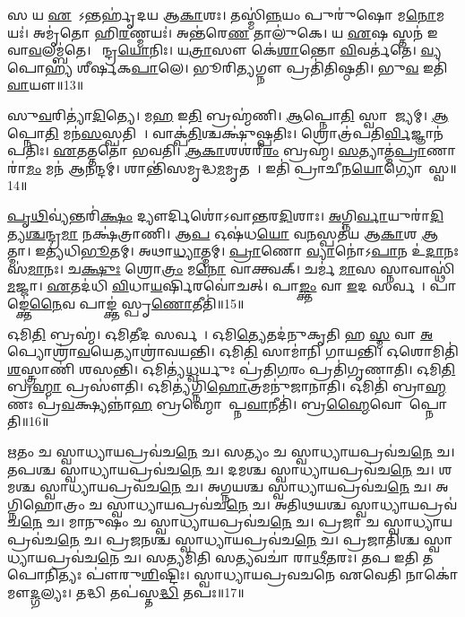 𑌸 𑌯 \ul{𑌏}𑌷𑍋᳚𑌽𑌨𑍍𑌤𑌰𑍍\mbox{}𑌹𑍃॑𑌦𑌯 𑌆\ul{𑌕𑌾}𑌶𑌃। 
𑌤𑌸𑍍𑌮𑌿॑\ul{𑌨𑍍𑌨}𑌯𑌂 𑌪𑍁𑌰𑍁॑𑌷𑍋 𑌮\ul{𑌨𑍋}𑌮𑌯𑌃॑। 
𑌅𑌮𑍃॑𑌤𑍋 𑌹𑌿\ul{𑌰}𑌣𑍍𑌮𑌯𑌃॑। 
𑌅𑌨𑍍𑌤॑𑌰𑍇\ul{𑌣} 𑌤𑌾𑌲𑍁॑𑌕𑍇। 
𑌯 \ul{𑌏}𑌷 𑌸𑍍𑌤𑌨॑ 𑌇𑌵𑌾\ul{𑌵}\-𑌲𑌮𑍍𑌬॑𑌤𑍇। 
𑌸𑍇᳚𑌨𑍍𑌦𑍍𑌰\ul{𑌯𑍋}𑌨𑌿𑌃। 
𑌯\ul{𑌤𑍍𑌰𑌾}𑌸𑍗 𑌕𑍇॑\ul{𑌶𑌾}𑌨𑍍𑌤𑍋 \ul{𑌵𑌿}𑌵𑌰𑍍𑌤॑𑌤𑍇। 
\ul{𑌵𑍍𑌯}𑌪𑍋𑌹𑍍𑌯॑ 𑌶𑍀𑌰𑍍\mbox{}𑌷𑌕\ul{𑌪𑌾}𑌲𑍇। 
𑌭𑍂𑌰𑌿\ul{𑌤𑍍𑌯}𑌗𑍍𑌨𑍗 𑌪𑍍𑌰𑌤𑌿॑𑌤𑌿𑌷𑍍𑌠𑌤𑌿। 
𑌭𑍁\ul{𑌵} 𑌇𑌤𑌿॑ \ul{𑌵𑌾}𑌯𑍗॥13॥

𑌸𑍁\ul{𑌵}𑌰𑌿𑌤𑍍𑌯𑌾॑\ul{𑌦𑌿}𑌤𑍍𑌯𑍇। 
𑌮\ul{𑌹} 𑌇\ul{𑌤𑌿} 𑌬𑍍𑌰𑌹𑍍𑌮॑𑌣𑌿। 
\ul{𑌆}𑌪𑍍𑌨𑍋\ul{𑌤𑌿} 𑌸𑍍𑌵𑌾𑌰𑌾᳚𑌜𑍍𑌯𑌮𑍍। 
\ul{𑌆}𑌪𑍍𑌨𑍋\ul{𑌤𑌿} 𑌮𑌨॑\ul{𑌸}𑌸𑍍𑌪𑌤𑌿𑌮𑍍᳚। 
𑌵𑌾𑌕𑍍𑌪॑\ul{𑌤𑌿}𑌶𑍍𑌚𑌕𑍍𑌷𑍁॑𑌷𑍍𑌪𑌤𑌿𑌃। 
𑌶𑍍𑌰𑍋𑌤𑍍𑌰॑𑌪𑌤𑌿\ul{𑌰𑍍𑌵𑌿}\-𑌜𑍍𑌞𑌾𑌨॑𑌪𑌤𑌿𑌃। 
\ul{𑌏}𑌤𑌤𑍍𑌤𑌤𑍋॑ 𑌭𑌵𑌤𑌿। 
\ul{𑌆}\ul{𑌕𑌾}𑌶𑌶॑𑌰𑍀\ul{𑌰𑌂} 𑌬𑍍𑌰𑌹𑍍𑌮॑। 
\ul{𑌸}𑌤𑍍𑌯𑌾𑌤𑍍𑌮॑\ul{𑌪𑍍𑌰𑌾}𑌣𑌾𑌰𑌾॑\ul{𑌮𑌂} 𑌮𑌨॑ 𑌆𑌨𑌨𑍍𑌦𑌮𑍍। 
𑌶𑌾𑌨𑍍𑌤𑌿॑𑌸𑌮𑍃𑌦𑍍𑌧\ul{𑌮}𑌮𑍃𑌤𑌮𑍍᳚। 
𑌇𑌤𑌿॑ 𑌪𑍍𑌰𑌾𑌚𑍀𑌨\ul{𑌯𑍋}𑌗𑍍𑌯𑍋𑌪𑌾᳚𑌸𑍍𑌵॥14॥
\anuvakamend[\ul{𑌵𑌾}𑌯𑌾\ul{𑌵}𑌮𑍃\ul{𑌤}𑌮𑍇𑌕𑌂॑ 𑌚]

\ul{𑌪𑍃}\ul{𑌥𑌿}𑌵𑍍𑌯॑𑌨𑍍𑌤𑌰𑌿॑\ul{𑌕𑍍𑌷𑌂} 𑌦𑍍𑌯𑍗𑌰𑍍𑌦𑌿𑌶𑍋॑𑌽𑌵𑌾𑌨𑍍𑌤𑌰\ul{𑌦𑌿}𑌶𑌾𑌃। 
\ul{𑌅}𑌗𑍍𑌨𑌿\ul{𑌰𑍍𑌵𑌾}𑌯𑍁𑌰𑌾॑\ul{𑌦𑌿}𑌤𑍍𑌯\-\ul{𑌶𑍍𑌚}𑌨𑍍𑌦𑍍𑌰\ul{𑌮𑌾} 𑌨𑌕𑍍𑌷॑𑌤𑍍𑌰𑌾𑌣𑌿। 
𑌆\ul{𑌪} 𑌓𑌷॑𑌧\ul{𑌯𑍋} 𑌵\ul{𑌨}𑌸𑍍𑌪𑌤॑𑌯 𑌆\ul{𑌕𑌾}𑌶 \ul{𑌆}𑌤𑍍𑌮𑌾। 
𑌇𑌤𑍍𑌯॑𑌧𑌿\ul{𑌭𑍂}𑌤𑌮𑍍। 
𑌅𑌥𑌾\ul{𑌧𑍍𑌯𑌾}𑌤𑍍𑌮𑌮𑍍। 
\ul{𑌪𑍍𑌰𑌾}𑌣𑍋 \ul{𑌵𑍍𑌯𑌾}𑌨𑍋॑𑌽\ul{𑌪𑌾}𑌨 𑌉॑\ul{𑌦𑌾}𑌨𑌃 𑌸॑\ul{𑌮𑌾}𑌨𑌃। 
𑌚\ul{𑌕𑍍𑌷𑍁𑌃} 𑌶𑍍𑌰𑍋\ul{𑌤𑍍𑌰𑌂} 𑌮\ul{𑌨𑍋} 𑌵𑌾𑌕𑍍𑌤𑍍𑌵𑌕𑍍। 
𑌚𑌰𑍍𑌮॑ \ul{𑌮𑌾}\ul{}𑌸 𑌸𑍍𑌨𑌾𑌵𑌾𑌸𑍍𑌥𑌿॑ \ul{𑌮}𑌜𑍍𑌜𑌾। 
\ul{𑌏}𑌤𑌦॑𑌧𑌿 \ul{𑌵𑌿}𑌧𑌾\ul{𑌯}𑌰𑍍\mbox{}\ul{𑌷𑌿}𑌰𑌵𑍋॑𑌚𑌤𑍍। 
𑌪𑌾\ul{𑌙𑍍𑌕𑍍𑌤𑌂} 𑌵𑌾 \ul{𑌇}𑌦 𑌸𑌰𑍍𑌵𑌮𑍍᳚। 
𑌪𑌾𑌙𑍍𑌕𑍍𑌤𑍇॑\ul{𑌨𑍈}𑌵 𑌪𑌾𑌙𑍍𑌕𑍍𑌤॑ 𑌸𑍍𑌪𑍃\ul{𑌣𑍋}𑌤𑍀𑌤𑌿॑॥15॥
\anuvakamend[𑌸\ul{𑌰𑍍𑌵}𑌮𑍇𑌕𑌂॑ 𑌚]

𑌓𑌮𑌿\ul{𑌤𑌿} 𑌬𑍍𑌰𑌹𑍍𑌮॑। 
𑌓𑌮𑌿\ul{𑌤𑍀}𑌦 𑌸𑌰𑍍𑌵𑌮𑍍᳚। 
𑌓𑌮𑌿\ul{𑌤𑍍𑌯𑍇}𑌤𑌦॑𑌨𑍁𑌕𑍃𑌤𑌿 𑌹 \ul{𑌸𑍍𑌮} 𑌵𑌾 \ul{𑌅}𑌪𑍍𑌯𑍋𑌶𑍍𑌰𑌾॑\ul{𑌵}𑌯𑍇𑌤𑍍𑌯𑌾𑌶𑍍𑌰𑌾॑𑌵𑌯𑌨𑍍𑌤𑌿। 
𑌓𑌮𑌿\ul{𑌤𑌿} 𑌸𑌾𑌮𑌾॑𑌨𑌿 𑌗𑌾𑌯𑌨𑍍𑌤𑌿। 
𑌓𑌶𑍋𑌮𑌿𑌤𑌿॑ \ul{𑌶}𑌸𑍍𑌤𑍍𑌰𑌾𑌣𑌿॑ 𑌶𑌸𑌨𑍍𑌤𑌿। 
𑌓𑌮𑌿𑌤𑍍𑌯॑\ul{𑌧𑍍𑌵}𑌰𑍍𑌯𑍁𑌃 𑌪𑍍𑌰॑𑌤𑌿\ul{𑌗}𑌰𑌂 𑌪𑍍𑌰𑌤𑌿॑𑌗𑍃𑌣𑌾𑌤𑌿। 
𑌓𑌮𑌿\ul{𑌤𑌿} 𑌬𑍍𑌰\ul{𑌹𑍍𑌮𑌾} 𑌪𑍍𑌰𑌸𑍗॑𑌤𑌿। 
𑌓𑌮𑌿𑌤𑍍𑌯॑𑌗𑍍𑌨𑌿\ul{𑌹𑍋}𑌤𑍍𑌰𑌮𑌨𑍁॑𑌜𑌾𑌨𑌾𑌤𑌿। 
𑌓𑌮𑌿𑌤𑌿॑ 𑌬𑍍𑌰𑌾\ul{𑌹𑍍𑌮}𑌣𑌃 𑌪𑍍𑌰॑\ul{𑌵}𑌕𑍍𑌷𑍍𑌯𑌨𑍍𑌨𑌾॑\ul{𑌹} 𑌬𑍍𑌰𑌹𑍍𑌮𑍋𑌪𑌾᳚𑌪𑍍𑌨\ul{𑌵𑌾}𑌨𑍀𑌤𑌿॑। 
𑌬𑍍𑌰\ul{𑌹𑍍𑌮𑍈}𑌵𑍋\-𑌪𑌾᳚𑌪𑍍𑌨𑍋𑌤𑌿॥16॥%
\anuvakamend[𑌓𑌨𑍍𑌦𑌶॑]

𑌋𑌤𑌂 𑌚 𑌸𑍍𑌵𑌾𑌧𑍍𑌯𑌾𑌯𑌪𑍍𑌰𑌵॑𑌚\ul{𑌨𑍇} 𑌚। 
𑌸𑌤𑍍𑌯𑌂 𑌚 𑌸𑍍𑌵𑌾𑌧𑍍𑌯𑌾𑌯𑌪𑍍𑌰𑌵॑𑌚\ul{𑌨𑍇} 𑌚। 
𑌤𑌪𑌶𑍍𑌚 𑌸𑍍𑌵𑌾𑌧𑍍𑌯𑌾𑌯𑌪𑍍𑌰𑌵॑𑌚\ul{𑌨𑍇} 𑌚। 
𑌦𑌮𑌶𑍍𑌚 𑌸𑍍𑌵𑌾𑌧𑍍𑌯𑌾𑌯𑌪𑍍𑌰𑌵॑𑌚\ul{𑌨𑍇} 𑌚। 
𑌶𑌮𑌶𑍍𑌚 𑌸𑍍𑌵𑌾𑌧𑍍𑌯𑌾𑌯𑌪𑍍𑌰𑌵॑𑌚\ul{𑌨𑍇} 𑌚। 
𑌅𑌗𑍍𑌨𑌯𑌶𑍍𑌚 𑌸𑍍𑌵𑌾𑌧𑍍𑌯𑌾𑌯𑌪𑍍𑌰𑌵॑𑌚\ul{𑌨𑍇} 𑌚। 
𑌅𑌗𑍍𑌨𑌿𑌹𑍋𑌤𑍍𑌰𑌂 𑌚 𑌸𑍍𑌵𑌾𑌧𑍍𑌯𑌾𑌯𑌪𑍍𑌰𑌵॑𑌚\ul{𑌨𑍇} 𑌚। 
𑌅𑌤𑌿𑌥𑌯𑌶𑍍𑌚 𑌸𑍍𑌵𑌾𑌧𑍍𑌯𑌾𑌯𑌪𑍍𑌰𑌵॑𑌚\ul{𑌨𑍇} 𑌚। 
𑌮𑌾𑌨𑍁𑌷𑌂 𑌚 𑌸𑍍𑌵𑌾𑌧𑍍𑌯𑌾𑌯𑌪𑍍𑌰𑌵॑𑌚\ul{𑌨𑍇} 𑌚। 
𑌪𑍍𑌰𑌜𑌾 𑌚 𑌸𑍍𑌵𑌾𑌧𑍍𑌯𑌾𑌯𑌪𑍍𑌰𑌵॑𑌚\ul{𑌨𑍇} 𑌚। 
𑌪𑍍𑌰𑌜𑌨𑌶𑍍𑌚 𑌸𑍍𑌵𑌾𑌧𑍍𑌯𑌾𑌯𑌪𑍍𑌰𑌵॑𑌚\ul{𑌨𑍇} 𑌚। 
𑌪𑍍𑌰𑌜𑌾𑌤𑌿𑌶𑍍𑌚 𑌸𑍍𑌵𑌾𑌧𑍍𑌯𑌾𑌯𑌪𑍍𑌰𑌵॑𑌚\ul{𑌨𑍇} 𑌚। 
𑌸𑌤𑍍𑌯𑌮𑌿𑌤𑌿 𑌸𑌤𑍍𑌯𑌵𑌚𑌾॑ 𑌰𑌾\ul{𑌥𑍀}𑌤𑌰𑌃। 
𑌤𑌪 𑌇𑌤𑌿 𑌤𑌪𑍋𑌨𑌿𑌤𑍍𑌯𑌃 𑌪𑍗॑𑌰𑍁\ul{𑌶𑌿}𑌷𑍍𑌟𑌿𑌃। 
𑌸𑍍𑌵𑌾𑌧𑍍𑌯𑌾𑌯𑌪𑍍𑌰𑌵𑌚𑌨𑍇 𑌏𑌵𑍇𑌤𑌿 𑌨𑌾𑌕𑍋॑ 𑌮𑍗\ul{𑌦𑍍𑌗}𑌲𑍍𑌯𑌃। 
𑌤𑌦𑍍𑌧𑌿 𑌤𑌪॑𑌸𑍍𑌤\ul{𑌦𑍍𑌧𑌿} 𑌤𑌪𑌃॥17॥
\anuvakamend[𑌪𑍍𑌰𑌜𑌾 𑌚 𑌸𑍍𑌵𑌾𑌧𑍍𑌯𑌾𑌯𑌪𑍍𑌰𑌵॑𑌚\ul{𑌨𑍇} 𑌚 𑌷𑌟𑍍𑌚॑]

